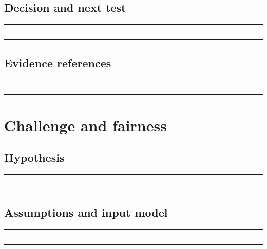 \documentclass[11pt]{article}
\begin{document}
\subsection{Decision and next test}
\noindent\rule{\linewidth}{0.35pt}\par\vspace{0.22in}
\noindent\rule{\linewidth}{0.35pt}\par\vspace{0.22in}
\noindent\rule{\linewidth}{0.35pt}\par\vspace{0.18in}

\subsection{Evidence references}
\noindent\rule{\linewidth}{0.35pt}\par\vspace{0.22in}
\noindent\rule{\linewidth}{0.35pt}\par\vspace{0.22in}
\noindent\rule{\linewidth}{0.35pt}\par\vspace{0.18in}
\clearpage

\section{Challenge and fairness}

\subsection{Hypothesis}
\noindent\rule{\linewidth}{0.35pt}\par\vspace{0.22in}
\noindent\rule{\linewidth}{0.35pt}\par\vspace{0.22in}
\noindent\rule{\linewidth}{0.35pt}\par\vspace{0.18in}

\subsection{Assumptions and input model}
\noindent\rule{\linewidth}{0.35pt}\par\vspace{0.22in}
\noindent\rule{\linewidth}{0.35pt}\par\vspace{0.22in}
\noindent\rule{\linewidth}{0.35pt}\par\vspace{0.18in}
\end{document}
